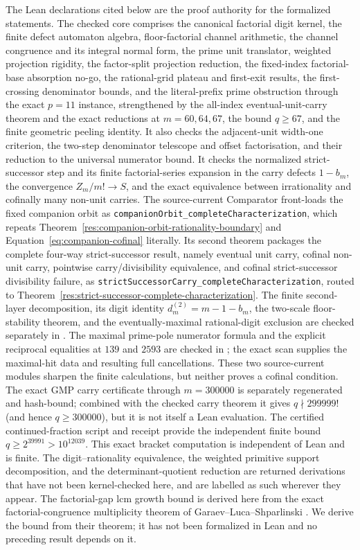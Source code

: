 \documentclass[11pt]{article}
\newcommand{\Ser}{S}
\begin{document}
The Lean declarations cited below are the proof authority for the formalized
statements.  The checked core comprises the canonical factorial digit kernel,
the finite defect automaton
algebra, floor-factorial channel arithmetic, the channel congruence and its
integral normal form, the prime unit translator, weighted projection rigidity,
the factor-split projection reduction, the fixed-index factorial-base
absorption no-go,
the rational-grid plateau and first-exit results, the first-crossing denominator
bounds, and the literal-prefix prime obstruction through the exact $p=11$
instance, strengthened by the all-index eventual-unit-carry theorem and the
exact reductions at $m=60,64,67$, the bound $q\ge67$, and the finite geometric
peeling identity.  It also checks the adjacent-unit width-one criterion, the
two-step denominator telescope and offset factorisation, and their reduction
to the universal numerator bound.  It checks the normalized strict-successor step and its
finite factorial-series expansion in the carry defects $1-b_m$, the convergence
$Z_m/m!\to\Ser$, and the exact equivalence between irrationality and cofinally
many non-unit carries.  The source-current Comparator front-loads the fixed
companion orbit as \texttt{companionOrbit\_completeCharacterization}, which
repeats Theorem~\ref{res:companion-orbit-rationality-boundary} and
Equation~\eqref{eq:companion-cofinal} literally.  Its second theorem packages
the complete four-way strict-successor result, namely eventual unit carry, cofinal
non-unit carry, pointwise carry/divisibility equivalence, and cofinal
strict-successor divisibility failure, as
\texttt{strictSuccessorCarry\_completeCharacterization}, routed to
Theorem~\ref{res:strict-successor-complete-characterization}.  The finite second-layer decomposition, its digit
identity $d^{(2)}_m=m-1-b_m$, the two-scale floor-stability theorem, and the
eventually-maximal rational-digit exclusion are checked separately in
.  The maximal prime-pole numerator formula and
the explicit reciprocal equalities at $139$ and $2593$ are checked in
; the exact scan supplies the maximal-hit data
and resulting full cancellations.  These two source-current modules sharpen
the finite calculations, but neither proves a cofinal condition.  The exact
GMP carry certificate through $m=300000$ is separately regenerated and
hash-bound; combined with the checked carry theorem it gives
$q\nmid299999!$ (and hence $q\ge300000$),
but it is not itself a Lean evaluation.  The certified continued-fraction
script and receipt provide the independent finite bound
$q\ge2^{39991}>10^{12039}$.  This exact bracket computation is independent of
Lean and is finite.  The digit--rationality equivalence, the weighted primitive support
decomposition, and the determinant-quotient reduction are returned derivations
that have not been kernel-checked here, and are labelled as such wherever they
appear.  The factorial-gap lcm growth bound is derived here from
the exact factorial-congruence multiplicity theorem of Garaev--Luca--Shparlinski
\cite[arXiv v1, Thm.~12, p.~16]{garaev-luca-shparlinski}.  We derive the bound
from their theorem; it has not been formalized in Lean and no preceding result
depends on it.
\end{document}
